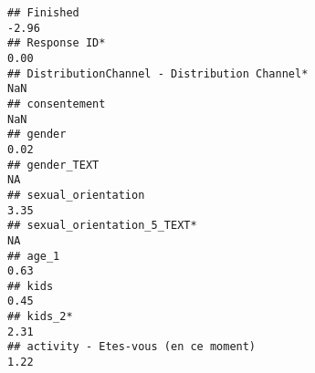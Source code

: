 \documentclass[
]{article}
\begin{document}
\begin{verbatim}
## Finished                                                                                                                                                                                                                    -2.96
## Response ID*                                                                                                                                                                                                                 0.00
## DistributionChannel - Distribution Channel*                                                                                                                                                                                   NaN
## consentement                                                                                                                                                                                                                  NaN
## gender                                                                                                                                                                                                                       0.02
## gender_TEXT                                                                                                                                                                                                                    NA
## sexual_orientation                                                                                                                                                                                                           3.35
## sexual_orientation_5_TEXT*                                                                                                                                                                                                     NA
## age_1                                                                                                                                                                                                                        0.63
## kids                                                                                                                                                                                                                         0.45
## kids_2*                                                                                                                                                                                                                      2.31
## activity - Etes-vous (en ce moment)                                                                                                                                                                                          1.22

\end{verbatim}
\end{document}
